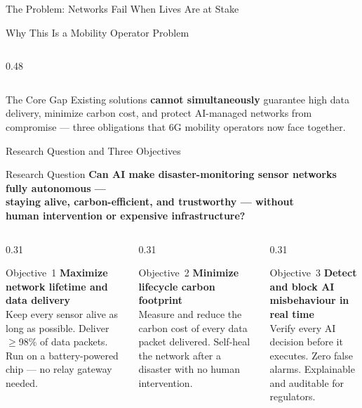 \documentclass[aspectratio=169,t,10pt]{beamer}
\begin{document}
\begin{frame}[shrink=5]{The Problem: Networks Fail When Lives Are at Stake}
\begin{alertblock}{\faBriefcase\; Why This Is a Mobility Operator Problem}
\begin{columns}[T]
\begin{column}{0.48\textwidth}
\begin{itemize}
    \end{itemize}
  \end{column}
  \end{columns}
\end{alertblock}
\vspace{6pt}
\begin{exampleblock}{The Core Gap}
  \centering\small
  Existing solutions \textbf{cannot simultaneously} guarantee high data delivery,
  minimize carbon cost, and protect AI-managed networks from compromise ---
  three obligations that 6G mobility operators now face together.
\end{exampleblock}
\end{frame}

\begin{frame}[shrink=5]{Research Question and Three Objectives}
\begin{exampleblock}{Research Question}
  \centering\normalsize
  \textbf{Can AI make disaster-monitoring sensor networks fully autonomous ---}\\
  \textbf{staying alive, carbon-efficient, and trustworthy --- without}\\
  \textbf{human intervention or expensive infrastructure?}
\end{exampleblock}
\vspace{8pt}
\begin{columns}[T]
\begin{column}{0.31\textwidth}
  \begin{block}{\faBolt\; Objective~1}
    \small\textbf{Maximize network lifetime and data delivery}\\[3pt]
    Keep every sensor alive as long as possible.
    Deliver $\geq$98\% of data packets.
    Run on a battery-powered chip --- no relay gateway needed.
  \end{block}
\end{column}
\begin{column}{0.31\textwidth}
  \begin{block}{\faLeaf\; Objective~2}
    \small\textbf{Minimize lifecycle carbon footprint}\\[3pt]
    Measure and reduce the carbon cost of every data packet delivered.
    Self-heal the network after a disaster with no human intervention.
  \end{block}
\end{column}
\begin{column}{0.31\textwidth}
  \begin{block}{\faLock\; Objective~3}
    \small\textbf{Detect and block AI misbehaviour in real time}\\[3pt]
    Verify every AI decision before it executes.
    Zero false alarms.
    Explainable and auditable for regulators.
  \end{block}
\end{column}
\end{columns}
\end{frame}
\end{document}
